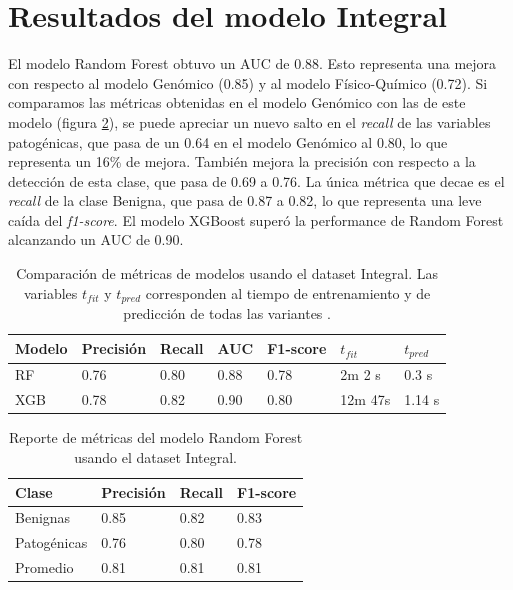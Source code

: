 \section{Resultados del modelo Integral}

El modelo Random Forest obtuvo un AUC de 0.88. Esto representa una mejora con respecto al modelo Genómico (0.85) y al modelo Físico-Químico (0.72). Si comparamos las métricas obtenidas en el modelo Genómico con las de este modelo (figura \ref{tab:metrics_integral_rf}), se puede apreciar un nuevo salto en el \textit{recall} de las variables patogénicas, que pasa de un 0.64 en el modelo Genómico al 0.80, lo que representa un 16\% de mejora. También mejora la precisión con respecto a la detección de esta clase, que pasa de 0.69 a 0.76. La única métrica que decae es el \textit{recall} de la clase Benigna, que pasa de 0.87 a 0.82, lo que representa una leve caída del \textit{f1-score}. El modelo XGBoost superó la performance de Random Forest alcanzando un AUC de 0.90.


\begin{table}[H]
\centering
\begin{tabular}{|l|l|l|l|l|l|l|}
\hline
Modelo & Precisión & Recall & AUC & F1-score & $t_{fit}$ & $t_{pred}$ \\ \hline
RF & 0.76 & 0.80 & 0.88 & 0.78 & 2m 2 s & 0.3 s \\ \hline
XGB & 0.78 & 0.82 & 0.90 & 0.80 & 12m 47s & 1.14 s \\ \hline
\end{tabular}
\label{tab:metrics_model}

\caption{Comparación de métricas de modelos usando el dataset Integral. Las variables $t_{fit}$ y $t_{pred}$ corresponden al tiempo de entrenamiento y de predicción de todas las variantes .}
\end{table}


\begin{table}[H]
\centering
\begin{tabular}{|l|l|l|l|}
\hline
Clase        & Precisión & Recall & F1-score \\ \hline
Benignas     & 0.85      & 0.82   & 0.83     \\ \hline
Patogénicas  & 0.76      & 0.80   & 0.78     \\ \hline
Promedio     & 0.81      & 0.81   & 0.81     \\ \hline
\end{tabular}
\caption{Reporte de métricas del modelo Random Forest usando el dataset Integral.}
\label{tab:metrics_integral_rf}
\end{table}


